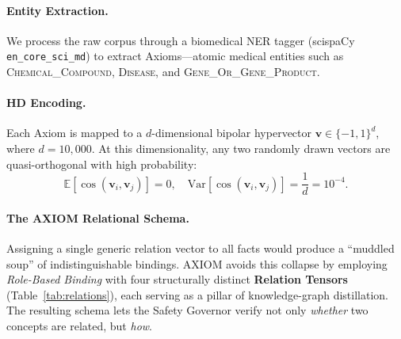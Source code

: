 \documentclass[11pt,a4paper]{article}
\begin{document}
\paragraph{Entity Extraction.}
We process the raw corpus through a biomedical NER tagger (scispaCy
\texttt{en\_core\_sci\_md}) to extract Axioms---atomic medical entities
such as \textsc{Chemical\_Compound}, \textsc{Disease}, and
\textsc{Gene\_Or\_Gene\_Product}.

\paragraph{HD Encoding.}
Each Axiom is mapped to a $d$-dimensional bipolar hypervector
$\mathbf{v} \in \{-1, 1\}^d$, where $d = 10{,}000$.  At this
dimensionality, any two randomly drawn vectors are quasi-orthogonal with
high probability:
\begin{equation}
    \mathbb{E}\left[\cos(\mathbf{v}_i, \mathbf{v}_j)\right] = 0, \quad
    \text{Var}\left[\cos(\mathbf{v}_i, \mathbf{v}_j)\right]
    = \frac{1}{d} = 10^{-4}.
    \label{eq:orthogonality}
\end{equation}

\paragraph{The AXIOM Relational Schema.}
Assigning a single generic relation vector to all facts would produce
a ``muddled soup'' of indistinguishable bindings.
AXIOM avoids this collapse by employing \emph{Role-Based Binding}
with four structurally distinct \textbf{Relation Tensors}
(Table~\ref{tab:relations}), each serving as a pillar of
knowledge-graph distillation.  The resulting schema lets the Safety
Governor verify not only \emph{whether} two concepts are related,
but \emph{how}.
\end{document}
